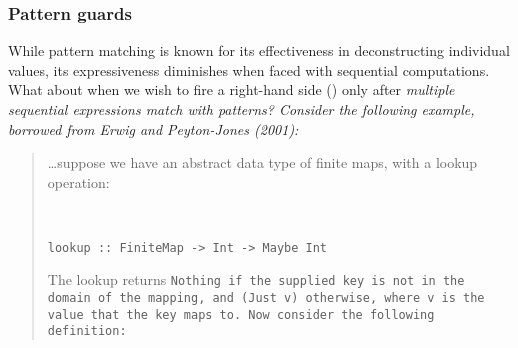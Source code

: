 \documentclass[manuscript,screen,review, 12pt]{acmart}
\begin{document}
\begin{outline}[enumerate]
 \subsubsection{Pattern guards}
\label{guards}


    



            While pattern matching is known for its effectiveness in
            deconstructing individual values, its expressiveness diminishes when
            faced with sequential computations. What about when we wish to fire
            a right-hand side () only after \it{multiple
            sequential expressions} match with patterns? Consider the following
            example, borrowed from Erwig and Peyton-Jones (2001): 

    \begin{quote}
    
    \dots suppose we have an abstract data type of finite maps, with a lookup
    operation:

        \begin{verbatim}


lookup :: FiniteMap -> Int -> Maybe Int
        \end{verbatim}

        The lookup returns \tt{Nothing} if the supplied key is not in the domain of
    the mapping, and \tt{(Just v)} otherwise, where \tt{v} is the value that the
    key maps to. Now consider the following definition:



\end{quote}
\end{outline}
\end{document}

